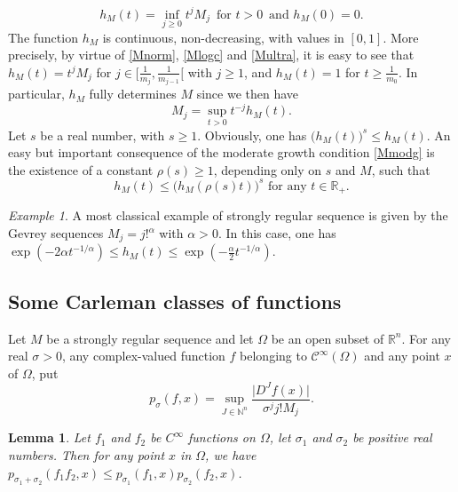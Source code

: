 \documentclass[a4paper]{amsart}
\theoremstyle{plain}
\newtheorem{lem}[subsubsection]{Lemma}
\theoremstyle{definition}
\theoremstyle{remark}
\newtheorem*{exam}{Example}
\begin{document}
\begin{equation*}
h_M(t)=\inf_{j\geq 0}t^j M_j\,\text{ for }t>0\,\text{ and }h_M(0)=0.
\end{equation*}
The function $ h_M $ is continuous, non-decreasing, with values in $ [0,1] $. More
precisely, by virtue of \eqref{Mnorm}, \eqref{Mlogc} and \eqref{Multra}, it is easy to see that
$ h_M(t)=t^j M_j $ for $ j\in [\frac{1}{m_j},\frac{1}{m_{j-1}}[ $ with $ j\geq 1 $, and
$ h_M(t)=1 $ for $ t\geq \frac{1}{m_0} $. In particular, $ h_M $ fully determines
$ M $ since we then have
\begin{equation*}
M_j=\sup_{t>0}t^{-j}h_M(t).
\end{equation*}
Let $ s $ be a real number, with $ s\geq 1 $. Obviously, one has 
$ \big(h_M(t)\big)^s\leq h_M(t) $. An easy but important consequence
of the moderate growth condition \eqref{Mmodg} is the
existence of a constant $ \rho(s)\geq 1 $, depending
only on $ s $ and $ M $, such that
\begin{equation}\label{hmodg}
h_M(t)\leq \big(h_M(\rho(s)t)\big)^s\text{ for any }t\in\mathbb{R}_+.
\end{equation}

\begin{exam}
A most classical example of
strongly regular sequence is given by the
Gevrey sequences $ M_j=j!^\alpha $ with $ \alpha>0 $. In this case, one
has
$ \exp(-2\alpha t^{-1/\alpha})\leq h_M(t)\leq\exp(-\frac{\alpha}{2}t^{-1/\alpha}).$
\end{exam}

\subsection{Some Carleman classes of functions}\label{classes}

Let $ M $ be a strongly regular sequence and let $ \Omega $ be an
open subset of $ \mathbb{R}^n $. For
any real $ \sigma>0 $, any complex-valued function $ f $ belonging to $ \mathcal{C}^\infty(\Omega) $ and any point $ x $ of
$ \Omega $, put
\begin{equation*}
p_\sigma(f,x)=\sup_{J\in\mathbb{N}^n}\frac{\vert D^Jf(x)\vert}{\sigma^jj!M_j}.
\end{equation*} 

\begin{lem}\label{elem}
Let $ f_1 $ and $ f_2 $ be $ C^\infty $ functions on $ \Omega $, let 
$ \sigma_1 $ and $ \sigma_2 $ be positive real numbers. Then for any point $ x $ in $ \Omega $, we have
$ p_{\sigma_1+\sigma_2}(f_1f_2,x)\leq p_{\sigma_1}(f_1,x)p_{\sigma_2}(f_2,x) $.
\end{lem}
\end{document}
